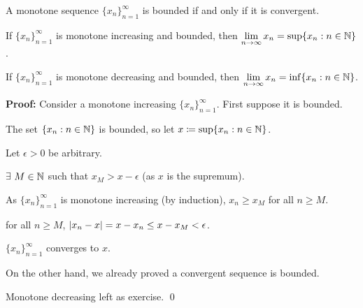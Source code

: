 \documentclass[10pt,aspectratio=149]{beamer}
\begin{document}
\begin{frame}

\begin{proposition}
A monotone sequence $\{ x_n \}_{n=1}^\infty$ is bounded if and only if it is convergent.

\pause
If $\{ x_n \}_{n=1}^\infty$ is monotone increasing and bounded, then \quad
$\displaystyle
\lim_{n\to \infty} x_n = \sup \{ x_n : n \in {\mathbb{N}} \}$.

\pause
If $\{ x_n \}_{n=1}^\infty$ is monotone decreasing and bounded, then \quad
$\displaystyle
\lim_{n\to \infty} x_n = \inf \{ x_n : n \in {\mathbb{N}} \}$.
\end{proposition}

\pause

\textbf{Proof:}
Consider a monotone increasing $\{x_n\}_{n=1}^\infty$.  First suppose it is bounded.

\pause
The set $\{ x_n : n \in  {\mathbb{N}} \}$ is bounded, so let
\quad $x \coloneqq \sup \{ x_n : n \in {\mathbb{N}} \}$.

\pause
Let $\epsilon > 0$ be arbitrary.

\pause
$\exists$ $M \in {\mathbb{N}}$ such that $x_{M} > x-\epsilon$ \quad (as $x$ is the supremum).

\pause
As $\{ x_n \}_{n=1}^\infty$ is monotone increasing (by induction),
\quad $x_n \geq x_M$ for all $n \geq M$.

\pause
\thus \quad for all $n \geq M$,
\quad $\left\lvert {x_n-x} \right\rvert = x-x_n \leq x-x_{M} < \epsilon$.

\pause
\thus \quad $\{x_n \}_{n=1}^\infty$ converges to $x$.

\medskip
\pause

On the other hand, we already proved a convergent sequence is bounded.

\medskip
\pause

Monotone decreasing left as exercise.
\qed

\end{frame}
\end{document}
